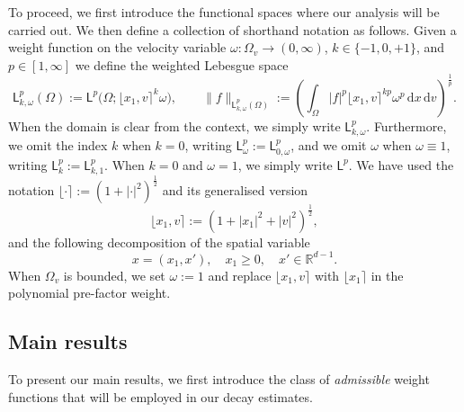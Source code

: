 \documentclass[11pt]{amsart}
\theoremstyle{definition}
\theoremstyle{remark}
\numberwithin{equation}{section}
\newcommand\R{{\mathbb R}}
\newcommand{\dd}{{\, \mathrm d}}
\newcommand{\sfL}{\mathsf{L}}
\newcommand{\wangle}[1]{\lfloor #1 \rceil}
\begin{document}
\medskip

To proceed, we first introduce the functional spaces where our analysis will be carried out. We then define a collection of shorthand notation as follows. Given a weight function on the velocity variable $\omega : \Omega_v \to (0,\infty)$, $k \in \{-1,0,+1\}$, and $p \in [1,\infty]$ we define the weighted Lebesgue space
\begin{equation}
  \label{eq:defLpkomega}
  \sfL^p _{k,\omega}(\Omega) := \sfL^p\bigl(\Omega;\wangle{x_1,v}^k\omega\bigr), \qquad
  \| f \|_{\sfL^{p} _{k,\omega}(\Omega)} := \left( \int_{\Omega} |f|^p \wangle{x_1,v}^{kp} \omega^p \dd x \dd v \right)^{\frac{1}{p}}.
\end{equation}
When the domain is clear from the context, we simply write $\sfL^p_{k,\omega}$. Furthermore, we omit the index $k$ when $k = 0$, writing $\sfL^p_{\omega} := \sfL^p_{0,\omega}$, and we omit $\omega$ when $\omega \equiv 1$, writing $\sfL^p_k := \sfL^p_{k,1}$. When $k=0$ and $\omega=1$, we simply write $\sfL^p$. We have used the notation $\wangle{\cdot} := (1 + |\cdot|^2)^{\frac{1}{2}}$ and its generalised version
\begin{equation*}
  \wangle{x_1,v}:= (1+|x_1|^2+|v|^2)^{\frac{1}{2}},
\end{equation*}
and the following decomposition of the spatial variable
\begin{equation*}
    x = (x_1,x'), \quad  x_1 \ge 0, \quad x' \in \R^{d-1}.
\end{equation*}
When $\Omega_v$ is bounded, we set $\omega := 1$ and replace $\wangle{x_1,v}$ with $\wangle{x_1}$ in the polynomial pre-factor weight.

\subsection{Main results}
\label{sec:results}

To present our main results, we first introduce the class of \emph{admissible} weight functions that will be employed in our decay estimates.
\end{document}
